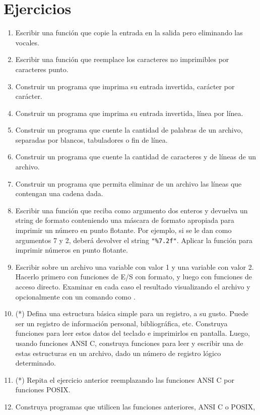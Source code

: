 \section{Ejercicios}
\label{sec:ej11}
\begin{enumerate}
\item Escribir una función que copie la entrada en la salida pero eliminando las
vocales.
\item Escribir una función que reemplace los caracteres no imprimibles por
caracteres punto.
\item Construir un programa que imprima su entrada invertida, carácter por carácter.
\item Construir un programa que imprima su entrada invertida, línea por línea.
\item Construir un programa que cuente la cantidad de palabras de un archivo,
separadas por blancos, tabuladores o fin de línea.
\item Construir un programa que cuente la cantidad de caracteres y de líneas de un
archivo.
\item Construir un programa que permita eliminar de un archivo las líneas que
contengan una cadena dada.
\item Escribir una función que reciba como argumento dos enteros y devuelva un
string de formato conteniendo una máscara de formato apropiada para imprimir un
número en punto flotante. Por ejemplo, si se le dan como argumentos 7 y 2,
deberá devolver el string \lstinline{"%7.2f"}. Aplicar la función para imprimir números en
punto flotante.
\item Escribir sobre un archivo una variable  con valor 1 y una variable 
con valor 2. Hacerlo primero con funciones de E/S con formato, y luego con
funciones de acceso directo. Examinar en cada caso el resultado visualizando el
archivo y opcionalmente con un comando como .
\item (*) Defina una estructura básica simple para un registro, a su gusto. Puede ser
un registro de información personal, bibliográfica, etc. Construya funciones
para leer estos datos del teclado e imprimirlos en pantalla. Luego, usando
funciones ANSI C, construya funciones para leer y escribir una de estas
estructuras en un archivo, dado un número de registro lógico determinado.
\item (*) Repita el ejercicio anterior reemplazando las funciones ANSI C por funciones
POSIX.
\item Construya programas que utilicen las funciones anteriores, ANSI C o POSIX,

\end{enumerate}
